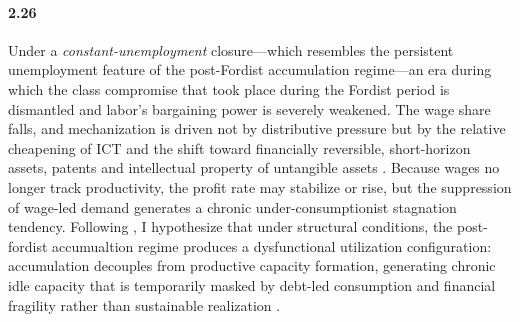 \paragraph{2.26}
Under a \textit{constant-unemployment} closure---which resembles the persistent unemployment feature of the post-Fordist accumulation regime---an era during which the class compromise that took place during the Fordist period is dismantled and labor's
bargaining power is severely weakened. The wage share falls,
and mechanization is driven not by distributive pressure but
by the relative cheapening of ICT and the shift toward
financially reversible, short-horizon assets, patents and intellectual property of untangible assets 
\citep{Lapavitsas2011, Pagano2014}. Because wages no longer
track productivity, the profit rate may stabilize or rise,
but the suppression of wage-led demand generates a chronic
under-consumptionist stagnation tendency. Following \citet{Vidal2019}, I hypothesize that under structural conditions, the post-fordist accumualtion regime produces a dysfunctional utilization configuration:
accumulation decouples from productive capacity formation,
generating chronic idle capacity that is temporarily masked
by debt-led consumption and financial fragility rather than
sustainable realization \citep{Stockhammer2012, Vidal2019}.

